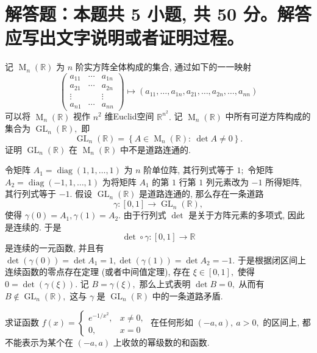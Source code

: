\section{解答题：本题共 5 小题, 共 50 分。解答应写出文字说明或者证明过程。}


\begin{question}[points = 8]
  记 $\operatorname{M}_n(\mathbb{R})$ 为 $n$ 阶实方阵全体构成的集合, 通过如下的一一映射
  $$\begin{pmatrix}
      a_{11} & \cdots & a_{1n} \\
      a_{21} & \cdots & a_{2n} \\
      \vdots & & \vdots \\
      a_{n1} & \cdots & a_{nn}
  \end{pmatrix} \mapsto (a_{11}, \dots, a_{1n}, a_{21}, \dots, a_{2n}, \dots, a_{nn})$$
  可以将 $\operatorname{M}_n(\mathbb{R})$ 视作 $n^2$ 维Euclid空间 $\mathbb{R}^{n^2}.$ 记 $\operatorname{M}_n(\mathbb{R})$ 中所有可逆方阵构成的集合为 $\operatorname{GL}_n(\mathbb{R}),$ 即
  $$\operatorname{GL}_n(\mathbb{R}) = \left\{ A \in \operatorname{M}_n(\mathbb{R}): ~ \det A \neq 0 \right\}.$$
  证明 $\operatorname{GL}_n(\mathbb{R})$ 在 $\operatorname{M}_n(\mathbb{R})$ 中不是道路连通的.

\end{question}

\begin{solution}
  令矩阵 $A_1 = \operatorname{diag}(1, 1, \dots, 1)$ 为 $n$ 阶单位阵, 其行列式等于 $1;$ 令矩阵 $A_2 = \operatorname{diag}(-1, 1, \dots, 1)$ 为将矩阵 $A_1$ 的第 $1$ 行第 $1$ 列元素改为 $-1$ 所得矩阵, 其行列式等于 $-1.$ 假设 $\operatorname{GL}_n(\mathbb{R})$ 是道路连通的, 那么存在一条道路
  $$\gamma: [0, 1] \longrightarrow \operatorname{GL}_n(\mathbb{R}),$$
  使得 $\gamma(0) = A_1, \gamma(1) = A_2.$
  由于行列式 $\det$ 是关于方阵元素的多项式, 因此是连续的. 于是
  $$\det\circ\gamma: [0, 1] \longrightarrow \mathbb{R}$$
  是连续的一元函数, 并且有 $\det(\gamma(0)) = \det A_1 = 1, \det(\gamma(1)) = \det A_2 = -1.$ 于是根据闭区间上连续函数的零点存在定理 (或者中间值定理), 存在 $\xi \in [0, 1],$ 使得 $0 = \det(\gamma(\xi)).$ 记 $B = \gamma(\xi),$ 那么上式表明 $\det B = 0,$ 从而有 $B \not\in \operatorname{GL}_n(\mathbb{R}),$ 这与 $\gamma$ 是 $\operatorname{GL}_n(\mathbb{R})$ 中的一条道路矛盾.
\end{solution}

\begin{question}[points = 10]
  求证函数 $f(x) = \begin{cases}
    e^{-1/x^2}, & x \neq 0, \\
    0, & x = 0
  \end{cases}$ 在任何形如 $(-a, a), ~ a > 0,$ 的区间上, 都不能表示为某个在 $(-a, a)$ 上收敛的幂级数的和函数.

\end{question}

